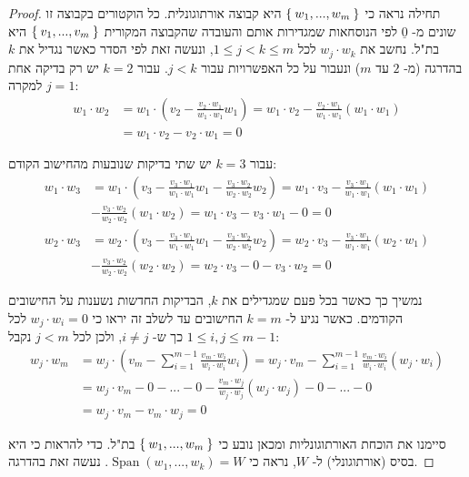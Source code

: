 \documentclass[12pt]{report}
\theoremstyle{plain}
\theoremstyle{definition}
\newcommand{\0}{\mathbf{0}}
\DeclareMathOperator{\Span}{Span}
\begin{document}
\begin{proof}
תחילה נראה כי
$\Set{w_1,...,w_m}$
היא קבוצה אורתוגונלית. כל הוקטורים בקבוצה זו שונים מ-
$\underline{0}$
לפי הנוסחאות שמגדירות אותם והעובדה שהקבוצה המקורית
$\Set{v_1,...,v_m}$
היא בת"ל. נחשב את
$w_j\cdot w_k$
לכל
$1\leq j<k\leq m$, 
ונעשה זאת לפי הסדר כאשר נגדיל את 
$k$
בהדרגה (מ-
$2$
עד
$m$)
ונעבור על כל האפשרויות עבור
$j<k$.
עבור
$k=2$
יש רק בדיקה אחת למקרה
$j=1$:
$$
\begin{aligned}
w_1\cdot w_2&=w_1\cdot(v_2-\frac{v_2\cdot w_1}{w_1\cdot w_1}w_1)=w_1\cdot v_2-\frac{v_2\cdot w_1}{w_1\cdot w_1}(w_1\cdot w_1) \\
&=w_1\cdot v_2-v_2\cdot w_1=0 
\end{aligned}
$$

עבור
$k=3$
יש שתי בדיקות שנובעות מהחישוב הקודם:
$$
\begin{aligned}
w_1\cdot w_3&=w_1\cdot(v_3-\frac{v_3\cdot w_1}{w_1\cdot w_1}w_1-\frac{v_3\cdot w_2}{w_2\cdot w_2}w_2)=w_1\cdot v_3-\frac{v_3\cdot w_1}{w_1\cdot w_1}(w_1\cdot w_1) \\
&-\frac{v_3\cdot w_2}{w_2\cdot w_2}(w_1\cdot w_2)=w_1\cdot v_3-v_3\cdot w_1-0=0 \\
w_2\cdot w_3&=w_2\cdot(v_3-\frac{v_3\cdot w_1}{w_1\cdot w_1}w_1-\frac{v_3\cdot w_2}{w_2\cdot w_2}w_2)=w_2\cdot v_3-\frac{v_3\cdot w_1}{w_1\cdot w_1}(w_2\cdot w_1) \\
&-\frac{v_3\cdot w_2}{w_2\cdot w_2}(w_2\cdot w_2)=w_2\cdot v_3-0-v_3\cdot w_2=0
\end{aligned}
$$

נמשיך כך כאשר בכל פעם שמגדילים את
$k$,
הבדיקות החדשות נשענות על החישובים הקודמים. כאשר נגיע ל-
$k=m$
החישובים עד לשלב זה יראו כי
$w_j\cdot w_i=0$
לכל
$1\leq i,j\leq m-1$
כך ש-
$i\neq j$,
ולכן לכל
$j<m$
נקבל:
$$
\begin{aligned}
w_j\cdot w_m&=w_j\cdot(v_m-\sum_{i=1}^{m-1}\frac{v_m\cdot w_i}{w_i\cdot w_i}w_i)=w_j\cdot v_m-\sum_{i=1}^{m-1}\frac{v_m\cdot w_i}{w_i\cdot w_i}(w_j\cdot w_i) \\
&=w_j\cdot v_m-0-...-0-\frac{v_m\cdot w_j}{w_j\cdot w_j}(w_j\cdot w_j)-0-...-0 \\
&=w_j\cdot v_m-v_m\cdot w_j=0
\end{aligned}
$$

סיימנו את הוכחת האורתוגונליות ומכאן נובע כי
$\Set{w_1,...,w_m}$
בת"ל. כדי להראות כי היא בסיס (אורתוגונלי) ל-
$W$,
נראה כי
$\Span(w_1,...,w_k)=W$.
נעשה זאת בהדרגה.


\end{proof}
\end{document}
